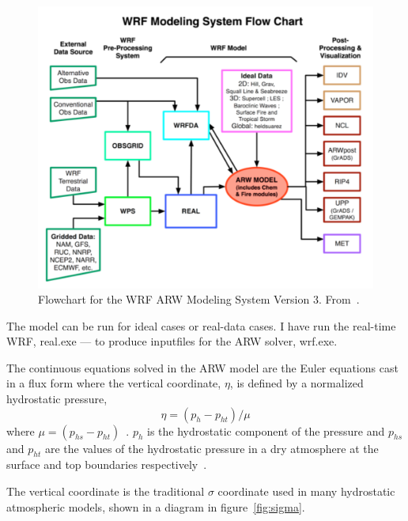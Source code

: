 \begin{figure}
\centering
\includegraphics[width=\textwidth]{model_methods/wrfflowchart}
\caption{Flowchart for the WRF ARW Modeling System Version 3. From~\citet{Wang2015}.}
\label{fig:wrfflowchart}
\end{figure}

The model can be run for ideal cases or real-data cases. I have run the real-time WRF, real.exe — to produce inputfiles for the ARW solver, wrf.exe.

The continuous equations solved in the ARW model are the Euler equations cast in a flux form where the vertical coordinate, $\eta$, is defined by a normalized hydrostatic pressure,
\begin{equation}
\eta = (p_h - p_{ht})/\mu 
\end{equation}
where $\mu = (p_{hs} - p_{ht})$~\citep{Skamarock2008}. $p_h$ is the hydrostatic component of the pressure and $p_{hs}$ and $p_{ht}$ are the values of the hydrostatic pressure in a dry atmosphere at the surface and top boundaries respectively~\citep{Skamarock2008}.

The vertical coordinate is the traditional $\sigma$ coordinate used in many hydrostatic atmospheric models, shown in a diagram in figure~\ref{fig:sigma}.


